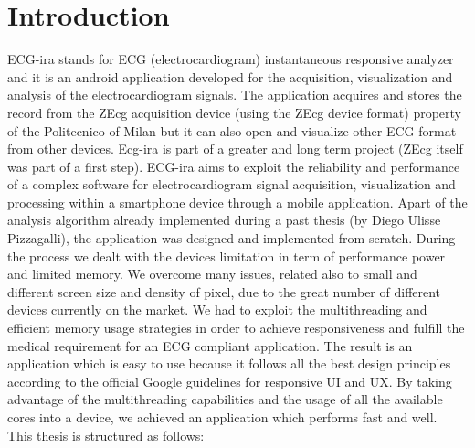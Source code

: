 
\chapter{Introduction}
\label{Chapter1} 

ECG-ira stands for ECG (electrocardiogram) instantaneous responsive analyzer and it is an android application developed for the acquisition, visualization and analysis of the electrocardiogram signals. The application acquires and stores  the record from the ZEcg acquisition device  (using the ZEcg device format) property of the Politecnico of Milan but it can also open and visualize other ECG format from other  devices. Ecg-ira is part of a greater and long term project (ZEcg itself was part of a first step). ECG-ira aims to exploit the reliability and performance of a complex software for electrocardiogram signal acquisition,  visualization  and processing within a smartphone device through a mobile application. Apart of the analysis algorithm already implemented during a past thesis (by Diego Ulisse Pizzagalli), the application was designed and implemented from scratch. During the process we dealt with the devices limitation in term of performance power and limited memory. We overcome many issues, related also to small and different screen size and density of pixel, due to the great number of different devices currently on the market. We had to exploit the multithreading and efficient memory usage strategies in order to achieve responsiveness and fulfill the medical requirement for an ECG compliant application. The result is an application which is easy to use because it follows all the best design principles according to the official Google guidelines for responsive UI and UX. By taking advantage of the multithreading capabilities and the usage of all the available cores into a device, we achieved an application which performs fast and well.\\
This thesis is structured as follows: 
